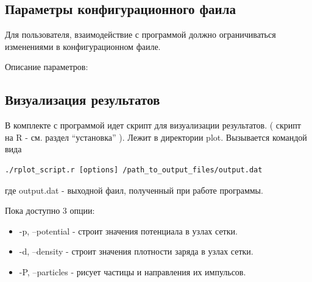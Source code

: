 \subsection{ Параметры конфигурационного фаила }
\label{sec:config_file}

Для пользователя, взаимодействие с программой должно ограничиваться изменениями в конфигурационном фаиле.


Описание параметров:

\subsection{ Визуализация результатов }

В комплекте с программой идет скрипт для визуализации результатов.
( скрипт на R - см. раздел ``установка'' ).
Лежит в директории plot. Вызывается командой вида
\begin{verbatim}
./rplot_script.r [options] /path_to_output_files/output.dat
\end{verbatim}
где output.dat - выходной фаил, полученный при работе программы.

Пока доступно 3 опции: 
\begin{itemize}
\item -p, --potential - строит значения потенциала в узлах сетки.
\item -d, --density - строит значения плотности заряда в узлах сетки.
\item -P, --particles - рисует частицы и направления их импульсов.
\end{itemize}

